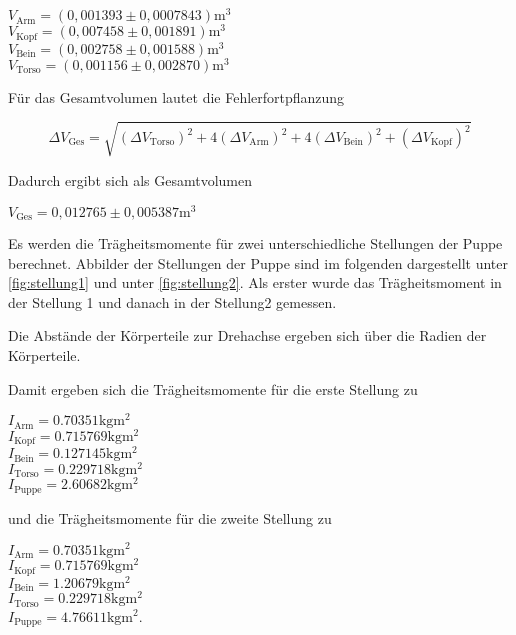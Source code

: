 \begin{center}
  $V_{\text{Arm}} = (0,001393 \pm 0,0007843) \si{\meter}^3$ \\
  $V_{\text{Kopf}} = (0,007458 \pm 0,001891) \si{\meter}^3$ \\
  $V_{\text{Bein}} = (0,002758 \pm 0,001588) \si{\meter}^3$ \\
  $V_{\text{Torso}} = (0,001156 \pm 0,002870) \si{\meter}^3$ \\
\end{center}

Für das Gesamtvolumen lautet die Fehlerfortpflanzung

\begin{equation}
  \Delta V_{\text{Ges}} = \sqrt{(\Delta V_{\text{Torso}})^2 + 4(\Delta V_{\text{Arm}})^2 + 4(\Delta V_{\text{Bein}})^2 + (\Delta V_{\text{Kopf}})^2}
\end{equation}

Dadurch ergibt sich als Gesamtvolumen

\begin{center}
  $V_{\text{Ges}} = 0,012765 \pm 0,005387 \si{\meter}^3$ 
\end{center}

Es werden die Trägheitsmomente für zwei unterschiedliche Stellungen der Puppe berechnet. Abbilder der Stellungen der Puppe sind im folgenden
dargestellt unter \autoref{fig:stellung1} und unter \autoref{fig:stellung2}. 
Als erster wurde das Trägheitsmoment in der Stellung 1 und danach in der Stellung2 gemessen.




Die Abstände der Körperteile zur Drehachse ergeben sich über die Radien der Körperteile.

Damit ergeben sich die Trägheitsmomente für die erste Stellung zu
\begin{center}
  $I_{\text{Arm}} = 0.70351 \si{\kilogram\meter^2}$ \\
  $I_{\text{Kopf}} = 0.715769 \si{\kilogram\meter^2}$ \\
  $I_{\text{Bein}} = 0.127145 \si{\kilogram\meter^2}$ \\
  $I_{\text{Torso}} = 0.229718 \si{\kilogram\meter^2}$ \\
  $I_{\text{Puppe}} = 2.60682 \si{\kilogram\meter^2}$ \\
\end{center}
und die Trägheitsmomente für die zweite Stellung zu
\begin{center}
  $I_{\text{Arm}} = 0.70351 \si{\kilogram\meter^2}$ \\
  $I_{\text{Kopf}} = 0.715769 \si{\kilogram\meter^2}$ \\
  $I_{\text{Bein}} = 1.20679 \si{\kilogram\meter^2}$ \\ 
  $I_{\text{Torso}} = 0.229718 \si{\kilogram\meter^2}$ \\
  $I_{\text{Puppe}} = 4.76611 \si{\kilogram\meter^2}$. \\
\end{center}

